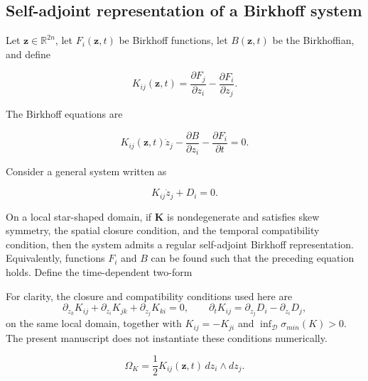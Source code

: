 \subsection{Self-adjoint representation of a Birkhoff system}\label{sec:symplectic-kam-5-3}

Let \(\mathbf{z} \in \mathbb{R}^{2n}\), let \(F_{i}\left( \mathbf{z},t \right)\) be Birkhoff functions, let \(B\left( \mathbf{z},t \right)\) be the Birkhoffian, and define

\begin{equation}
\label{eq:symplectic-kam-5-5}
K_{ij}\left( \mathbf{z},t \right) = \frac{\partial F_{j}}{\partial z_{i}} - \frac{\partial F_{i}}{\partial z_{j}}.
\end{equation}

The Birkhoff equations are

\begin{equation}
\label{eq:symplectic-kam-5-6}
\boxed{K_{ij}\left( \mathbf{z},t \right){\dot{z}}_{j} - \frac{\partial B}{\partial z_{i}} - \frac{\partial F_{i}}{\partial t} = 0.}
\end{equation}

Consider a general system written as

\begin{equation}
\label{eq:symplectic-kam-5-7}
K_{ij}{\dot{z}}_{j} + D_{i} = 0.
\end{equation}

On a local star-shaped domain, if \(\mathbf{K}\) is nondegenerate and satisfies skew symmetry, the spatial closure condition, and the temporal compatibility condition, then the system admits a regular self-adjoint Birkhoff representation. Equivalently, functions \(F_{i}\) and \(B\) can be found such that the preceding equation holds\cite{FengQin2010,HairerLubichWanner2006GNI}. Define the time-dependent two-form

For clarity, the closure and compatibility conditions used here are
\[
\partial_{z_k}K_{ij}+\partial_{z_i}K_{jk}+\partial_{z_j}K_{ki}=0,\qquad
\partial_t K_{ij}=\partial_{z_j}D_i-\partial_{z_i}D_j,
\]
on the same local domain, together with \(K_{ij}=-K_{ji}\) and \(\inf_{\mathcal{D}}\sigma_{min}(K)>0\). The present manuscript does not instantiate these conditions numerically.

\begin{equation}
\label{eq:symplectic-kam-5-8}
\Omega_{K} = \frac{1}{2}K_{ij}\left( \mathbf{z},t \right)\, dz_{i} \land dz_{j}.
\end{equation}

